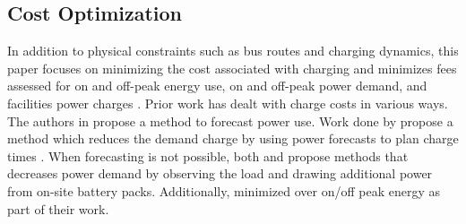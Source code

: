 \subsection{Cost Optimization}
In addition to physical constraints such as bus routes and charging dynamics, this paper focuses on minimizing the cost associated with charging and minimizes fees assessed for on and off-peak energy use, on and off-peak power demand, and facilities power charges \cite{rocky_mountain_power_rocky_2021}. Prior work has dealt with charge costs in various ways.  
The authors in \cite{gao_charging_2019} propose a method to forecast power use. Work done by \cite{qin_numerical_2016} propose a method which reduces the demand charge by using power forecasts to plan charge times \cite{gao_charging_2019}.  When forecasting is not possible, both \cite{ojer_development_2020} and \cite{cheng_smart_2020} propose methods that decreases power demand by observing the load and drawing additional power from on-site battery packs. Additionally, \cite{el-taweel_incorporation_2019} minimized over on/off peak energy as part of their work.

